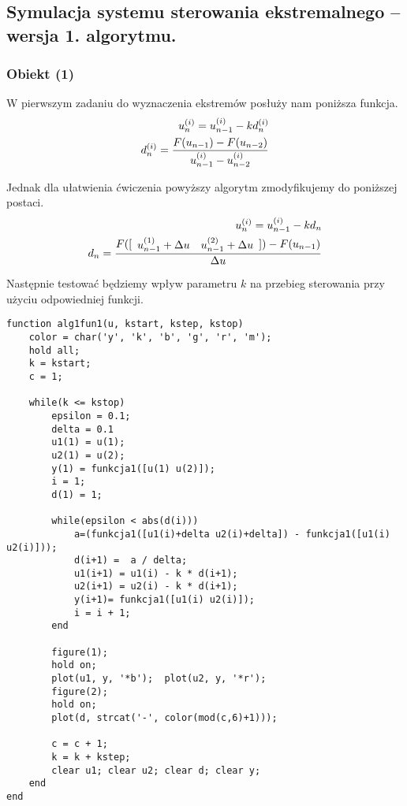 \documentclass[a4paper,10pt]{article}
\begin{document}
\subsection{Symulacja systemu sterowania ekstremalnego – wersja 1. algorytmu.}

\subsubsection{Obiekt (1)}
W pierwszym zadaniu do wyznaczenia ekstremów posłuży nam poniższa funkcja.
\begin{eqnarray}
	u_n^{(i)} = u_{n-1}^{(i)}-kd_n^{(i)}\\
	d_n^{(i)} = {F(u_{n-1}) - F(u_{n-2}) \over u_{n-1}^{(i)} - u_{n-2}^{(i)}}
\end{eqnarray}

Jednak dla ułatwienia ćwiczenia powyższy algorytm zmodyfikujemy do poniższej postaci.
\begin{eqnarray}
	u_n^{(i)} = u_{n-1}^{(i)}-kd_n\\
	d_n = {F([\begin{array}{ll} u_{n-1}^{(1)} + \Delta u & u_{n-1}^{(2)} + \Delta u\end{array}]) - F(u_{n-1}) \over \Delta u}
\end{eqnarray}

Następnie testować będziemy wpływ parametru $k$ na przebieg sterowania przy użyciu odpowiedniej funkcji.
\begin{lstlisting}[caption=Funkcja testująca wpływ parametru $k$ na przebieg wartości $d$.]
function alg1fun1(u, kstart, kstep, kstop)
    color = char('y', 'k', 'b', 'g', 'r', 'm');
    hold all;
    k = kstart;
    c = 1;
    
    while(k <= kstop)
        epsilon = 0.1;
        delta = 0.1
        u1(1) = u(1);
        u2(1) = u(2);
        y(1) = funkcja1([u(1) u(2)]);
        i = 1;
        d(1) = 1;
        
        while(epsilon < abs(d(i)))
            a=(funkcja1([u1(i)+delta u2(i)+delta]) - funkcja1([u1(i) u2(i)]));
            d(i+1) =  a / delta;
            u1(i+1) = u1(i) - k * d(i+1);
            u2(i+1) = u2(i) - k * d(i+1);
            y(i+1)= funkcja1([u1(i) u2(i)]);
            i = i + 1;
        end

        figure(1);
        hold on;
        plot(u1, y, '*b');  plot(u2, y, '*r');
        figure(2);
        hold on;
        plot(d, strcat('-', color(mod(c,6)+1)));
        
        c = c + 1;
        k = k + kstep;
        clear u1; clear u2; clear d; clear y;
    end
end
\end{lstlisting}
\end{document}
